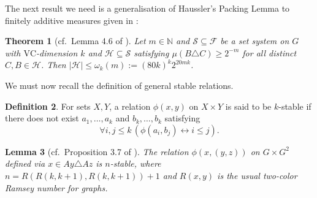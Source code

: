 \documentclass[11pt]{amsart}
\newtheorem{theorem}{Theorem}[section]
\newtheorem{lemma}[theorem]{Lemma}
\theoremstyle{definition}
\newtheorem{definition}[theorem]{Definition}
\theoremstyle{remark}
\def\NN{\mathbb{N}}
\begin{document}
The next result we need is a generalisation of Haussler's Packing Lemma 
\cite{haussler1995sphere} to finitely additive measures given in \cite{lovasz2010regularity}:

\begin{theorem}[cf.\ Lemma 4.6 of \cite{lovasz2010regularity}]
\label{thrm:packing}
    Let $m \in \NN$ and $\mathcal{S} \subseteq \mathcal{F}$ be a set system on $G$ with  $\mathrm{VC}$-dimension $k$ and $\mathcal{H} \subseteq \mathcal{S}$ satisfying  $\mu(B \triangle C) \ge 2^{-m}$ for all distinct $C, B \in \mathcal{H}$. Then $|\mathcal{H}| \le  \omega_k(m):=(80k)^k2^{20mk}$.
\end{theorem}
We must now recall the definition of general stable relations.
\begin{definition}
    For sets $X, Y$, a relation $\phi(x,y)$ on $X \times Y$ is said to be $k$-stable if there does not exist $a_1,\ldots,a_k$ and $b_k,\ldots,b_k$ satisfying 
    \[
    \forall i,j\le k \,(\phi(a_i,b_j)  \leftrightarrow i \le j). 
    \] 
\end{definition}
\begin{lemma}[cf.\ Proposition 3.7 of \cite{conant2021quantitative}]
\label{lem:stable:symm}
    The relation $\phi(x,(y,z))$ on $G \times G^2$ defined via $x \in Ay \triangle Az$ is $n$-stable, where $n= R(R(k, k + 1), R(k, k + 1))+ 1$ and $R(x,y)$ is the usual two-color Ramsey number for graphs.
\end{lemma}
\end{document}
